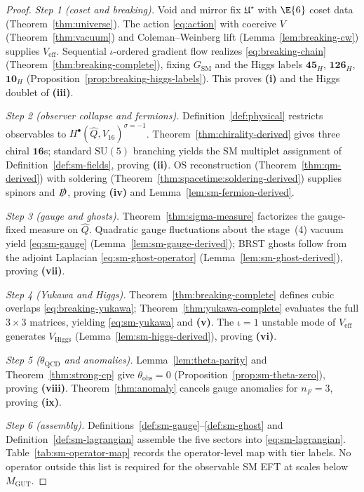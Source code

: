 \begin{proof}
\emph{Step 1 (coset and breaking).}
Void and mirror fix $\mathfrak{U}^\star$ with $\E{6}$ coset data
(Theorem~\ref{thm:universe}). The action \eqref{eq:action} with coercive
$V$ (Theorem~\ref{thm:vacuum}) and Coleman--Weinberg lift
(Lemma~\ref{lem:breaking-cw}) supplies $V_{\mathrm{eff}}$. Sequential
$\iota$-ordered gradient flow realizes \eqref{eq:breaking-chain}
(Theorem~\ref{thm:breaking-complete}), fixing $G_{\mathrm{SM}}$ and the Higgs
labels $\mathbf{45}_H$, $\mathbf{126}_H$, $\mathbf{10}_H$
(Proposition~\ref{prop:breaking-higgs-labels}). This proves
\textbf{(i)} and the Higgs doublet of \textbf{(iii)}.

\emph{Step 2 (observer collapse and fermions).}
Definition~\ref{def:physical} restricts observables to
$H^\bullet(\hat Q,V_{16})^{\sigma=-1}$. Theorem~\ref{thm:chirality-derived}
gives three chiral $\mathbf{16}$s; standard $\mathrm{SU}(5)$ branching yields
the SM multiplet assignment of Definition~\ref{def:sm-fields}, proving
\textbf{(ii)}. OS reconstruction (Theorem~\ref{thm:qm-derived}) with soldering
(Theorem~\ref{thm:spacetime:soldering-derived}) supplies spinors and
$\slashed{D}$, proving \textbf{(iv)} and Lemma~\ref{lem:sm-fermion-derived}.

\emph{Step 3 (gauge and ghosts).}
Theorem~\ref{thm:sigma-measure} factorizes the gauge-fixed measure on
$\hat Q$. Quadratic gauge fluctuations about the stage~(4) vacuum yield
\eqref{eq:sm-gauge} (Lemma~\ref{lem:sm-gauge-derived}); BRST ghosts follow
from the adjoint Laplacian \eqref{eq:sm-ghost-operator}
(Lemma~\ref{lem:sm-ghost-derived}), proving \textbf{(vii)}.

\emph{Step 4 (Yukawa and Higgs).}
Theorem~\ref{thm:breaking-complete} defines cubic overlaps
\eqref{eq:breaking-yukawa}; Theorem~\ref{thm:yukawa-complete} evaluates the
full $3\times3$ matrices, yielding \eqref{eq:sm-yukawa} and \textbf{(v)}.
The $\iota=1$ unstable mode of $V_{\mathrm{eff}}$ generates
$V_{\mathrm{Higgs}}$ (Lemma~\ref{lem:sm-higgs-derived}), proving
\textbf{(vi)}.

\emph{Step 5 ($\theta_{\mathrm{QCD}}$ and anomalies).}
Lemma~\ref{lem:theta-parity} and Theorem~\ref{thm:strong-cp} give
$\theta_{\mathrm{obs}}=0$ (Proposition~\ref{prop:sm-theta-zero}), proving
\textbf{(viii)}. Theorem~\ref{thm:anomaly} cancels gauge anomalies for
$n_F=3$, proving \textbf{(ix)}.

\emph{Step 6 (assembly).}
Definitions~\ref{def:sm-gauge}--\ref{def:sm-ghost} and
Definition~\ref{def:sm-lagrangian} assemble the five sectors into
\eqref{eq:sm-lagrangian}. Table~\ref{tab:sm-operator-map} records the
operator-level map with tier labels. No operator outside this list is required
for the observable SM EFT at scales below $M_{\mathrm{GUT}}$.
\end{proof}

